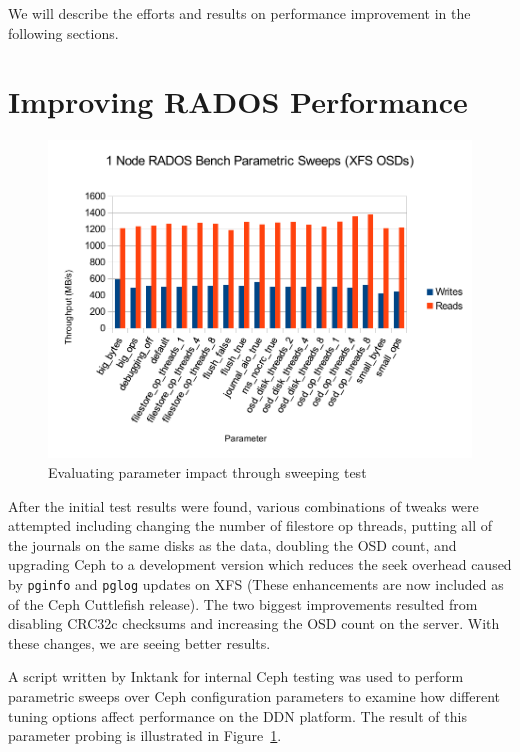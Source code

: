 \documentclass{article}
\begin{document}

We will describe the efforts and results on performance improvement in the
following sections.

\section{Improving RADOS Performance}

\begin{figure}[h]
\centering
\includegraphics[width=5in]{parametric}
\caption{Evaluating parameter impact through sweeping test}
\label{fig:parametric}
\end{figure}


After the initial test results were found, various combinations of tweaks were
attempted including changing the number of filestore op threads, putting all
of the journals on the same disks as the data, doubling the OSD count, and
upgrading Ceph to a development version which reduces the seek overhead caused
by \texttt{pginfo} and \texttt{pglog} updates on XFS (These enhancements are
now included as of the Ceph Cuttlefish release).  The two biggest improvements
resulted from disabling CRC32c checksums and increasing the OSD count on the
server.  With these changes, we are seeing better results.

A script written by Inktank for internal Ceph testing was used to perform
parametric sweeps over Ceph configuration parameters to examine how different
tuning options affect performance on the DDN platform. The result of this
parameter probing is illustrated in Figure~\ref{fig:parametric}. 
\end{document}
